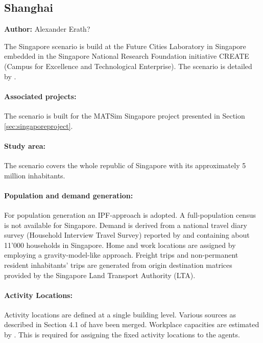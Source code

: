 \subsection{Shanghai}
\label{ch:scenarios:shanghai}
\hfill \textbf{Author:} Alexander Erath?

The Singapore scenario is build at the Future Cities Laboratory in Singapore embedded in the Singapore National Research Foundation initiative CREATE (Campus for Excellence and Technological Enterprise). The scenario is detailed by \citet[][]{ErathEtAl_TechRep_FCL_forth, Erath_unpub_UniSeoul_2011}.

\paragraph{Associated projects:} 
The scenario is built for the MATSim Singapore project presented in Section \ref{sec:singaporeproject}.

\paragraph{Study area:} 
The scenario covers the whole republic of Singapore with its approximately 5 million inhabitants.

\paragraph{Population and demand generation:} 
For population generation an IPF-approach is adopted. A full-population census is not available for Singapore. Demand is derived from a national travel diary survey (Household Interview Travel Survey) reported by \citet[][]{Choi_JOUR_2010} and containing about 11'000 households in Singapore. Home and work locations are assigned by employing a gravity-model-like approach. Freight trips and non-permanent resident inhabitants' trips are generated from origin destination matrices provided by the Singapore Land Transport Authority (LTA).

\paragraph{Activity Locations:} 
Activity locations are defined at a single building level. Various sources as described in Section 4.1 of \citet[][]{ErathEtAl_TechRep_FCL_forth} have been merged. Workplace capacities are estimated by \citet[][]{OrdonezErath_TRR_2013}. This is required for assigning the fixed activity locations to the agents.


